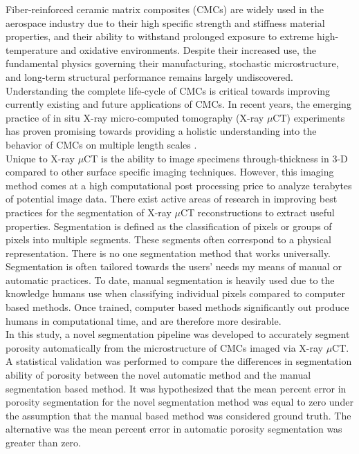 \documentclass[11pt, twocolumn]{article}
\begin{document}
Fiber-reinforced ceramic matrix composites (CMCs) are widely used in the aerospace industry due to their high specific strength and stiffness material properties, and their ability to withstand prolonged exposure to extreme high-temperature and oxidative environments. Despite their increased use, the fundamental physics governing their manufacturing, stochastic microstructure, and long-term structural performance remains largely undiscovered. Understanding the complete life-cycle of CMCs is critical towards improving currently existing and future applications of CMCs. In recent years, the emerging practice of in situ X-ray micro-computed tomography (X-ray $\mu$CT) experiments has proven promising towards providing a holistic understanding into the behavior of CMCs on multiple length scales \cite{Larson,Bale,Bale2,Cox,Haboub,Marshall}.\\
Unique to X-ray $\mu$CT is the ability to image specimens through-thickness in 3-D compared to other surface specific imaging techniques. However, this imaging method comes at a high computational post processing price to analyze terabytes of potential image data. There exist active areas of research in improving best practices for the segmentation of X-ray $\mu$CT reconstructions to extract useful properties. Segmentation is defined as the classification of pixels or groups of pixels into multiple segments. These segments often correspond to a physical representation. There is no one segmentation method that works universally. Segmentation is often tailored towards the users’ needs my means of manual or automatic practices. To date, manual segmentation is heavily used due to the knowledge humans use when classifying individual pixels compared to computer based methods. Once trained, computer based methods significantly out produce humans in computational time, and are therefore more desirable.\\
In this study, a novel segmentation pipeline was developed to accurately segment porosity automatically from the microstructure of CMCs imaged via X-ray $\mu$CT. A statistical validation was performed to compare the differences in segmentation ability of porosity between the novel automatic method and the manual segmentation based method. It was hypothesized that the mean percent error in porosity segmentation for the novel segmentation method was equal to zero under the assumption that the manual based method was considered ground truth. The alternative was the mean percent error in automatic porosity segmentation was greater than zero.
\end{document}
